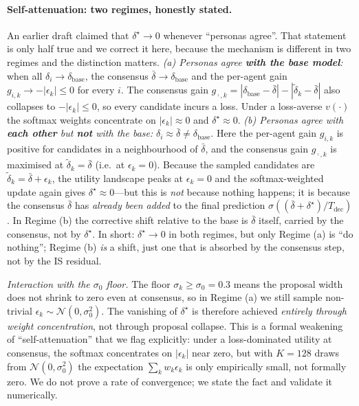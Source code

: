 \documentclass{article}
\begin{document}
\paragraph{Self-attenuation: two regimes, honestly stated.}
An earlier draft claimed that $\delta^{\star}\to 0$ whenever ``personas
agree''. That statement is only half true and we correct it here, because the
mechanism is different in two regimes and the distinction matters.
\emph{(a) Personas agree \textbf{with the base model}:} when all
$\delta_i\to\delta_{\text{base}}$, the consensus
$\bar{\delta}\to\delta_{\text{base}}$ and the per-agent gain
$g_{i,k}\to-|\epsilon_k|\le 0$ for every $i$. The consensus gain
$g_{\bar{\cdot},k}=|\delta_{\text{base}}-\bar{\delta}|-|\tilde{\delta}_k-\bar{\delta}|$
also collapses to $-|\epsilon_k|\le 0$, so every candidate incurs a loss.
Under a loss-averse $v(\cdot)$ the softmax weights concentrate on
$|\epsilon_k|\approx 0$ and $\delta^{\star}\approx 0$.
\emph{(b) Personas agree with \textbf{each other} but \textbf{not} with the
base:} $\delta_i\approx\bar{\delta}\neq\delta_{\text{base}}$. Here the per-agent
gain $g_{i,k}$ is positive for candidates in a neighbourhood of
$\bar{\delta}$, and the consensus gain $g_{\bar{\cdot},k}$ is maximised at
$\tilde{\delta}_k=\bar{\delta}$ (i.e.\ at $\epsilon_k=0$). Because the sampled
candidates are $\tilde{\delta}_k=\bar{\delta}+\epsilon_k$, the utility landscape
peaks at $\epsilon_k=0$ and the softmax-weighted update again gives
$\delta^{\star}\approx 0$---but this is \emph{not} because nothing happens;
it is because the consensus $\bar{\delta}$ has \emph{already been added} to
the final prediction $\sigma((\bar{\delta}+\delta^{\star})/T_{\text{dec}})$.
In Regime (b) the corrective shift relative to the base is $\bar{\delta}$
itself, carried by the consensus, not by $\delta^{\star}$.
In short: $\delta^{\star}\to 0$ in both regimes, but only Regime (a) is
``do nothing''; Regime (b) \emph{is} a shift, just one that is absorbed by
the consensus step, not by the IS residual.

\emph{Interaction with the $\sigma_0$ floor.} The floor
$\sigma_k\ge\sigma_0=0.3$ means the proposal width does not shrink to zero
even at consensus, so in Regime (a) we still sample non-trivial
$\epsilon_k\sim\mathcal{N}(0,\sigma_0^2)$. The vanishing of $\delta^{\star}$
is therefore achieved \emph{entirely through weight concentration}, not
through proposal collapse. This is a formal weakening of ``self-attenuation''
that we flag explicitly: under a loss-dominated utility at consensus, the
softmax concentrates on $|\epsilon_k|$ near zero, but with $K=128$ draws from
$\mathcal{N}(0,\sigma_0^2)$ the expectation $\sum_k w_k\epsilon_k$ is only
empirically small, not formally zero. We do not prove a rate of convergence;
we state the fact and validate it numerically.
\end{document}
